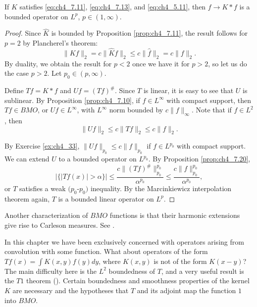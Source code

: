 
\begin{theorem}\label{thm:ch4_7.22}
If $K$ satisfies \eqref{eq:ch4_7.11}, \eqref{eq:ch4_7.13}, and \eqref{eq:ch4_5.11}, then $f \to K * f$ is a bounded operator on $L^p$, $p \in (1,\infty)$.
\end{theorem}

\begin{proof}
Since $\widehat{K}$ is bounded by Proposition \ref{prop:ch4_7.11}, the result follows for $p = 2$ by Plancherel's theorem:
\[
    \|Kf\|_2 = c\|\widehat{K}f\|_2 \leq c\|\widehat{f}\|_2 = c\|f\|_2.
\]
By duality, we obtain the result for $p < 2$ once we have it for $p > 2$, so let us do the case $p > 2$. Let $p_0 \in (p,\infty)$.

Define $Tf = K * f$ and $Uf = (Tf)^\#$. Since $T$ is linear, it is easy to see that $U$ is sublinear. By Proposition \ref{prop:ch4_7.10}, if $f \in L^\infty$ with compact support, then $Tf \in BMO$, or $Uf \in L^\infty$, with $L^\infty$ norm bounded by $c\|f\|_\infty$. Note that if $f \in L^2$, then
\[
    \|Uf\|_2 \leq c\|Tf\|_2 \leq c\|f\|_2.
\]

By Exercise \ref{ex:ch4_33}, $\|Uf\|_{p_0} \leq c\|f\|_{p_0}$ if $f \in L^{p_0}$ with compact support. We can extend $U$ to a bounded operator on $L^{p_0}$. By Proposition \ref{prop:ch4_7.20},
\[
    |\{|Tf(x)| > \alpha\}| \leq \frac{c\|(Tf)^\#\|_{p_0}^{p_0}}{\alpha^{p_0}} \leq \frac{c\|f\|_{p_0}^{p_0}}{\alpha^{p_0}},
\]
\mnewpage
or $T$ satisfies a weak $(p_0$-$p_0)$ inequality. By the Marcinkiewicz interpolation theorem again, $T$ is a bounded linear operator on $L^p$.
\end{proof}


Another characterization of $BMO$ functions is that their harmonic extensions give rise to Carleson measures. See \cite{FeffermanStein1972}.

In this chapter we have been exclusively concerned with operators arising from convolution with some function. What about operators of the form $Tf(x) = \int K(x,y)f(y)dy$, where $K(x,y)$ is not of the form $K(x-y)$? The main difficulty here is the $L^2$ boundedness of $T$, and a very useful result is the $T1$ theorem (\cite{DavidJourne1984}). Certain boundedness and smoothness properties of the kernel $K$ are necessary and the hypotheses that $T$ and its adjoint map the function $1$ into $BMO$.


